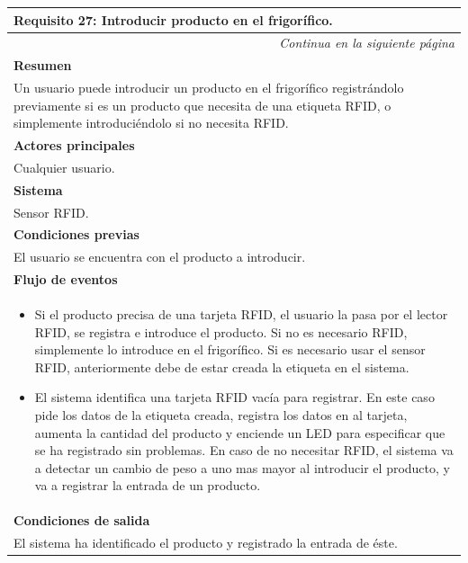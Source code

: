 \begin{longtable}{|p{}|}
\hline
 \rowcolor[gray]{.5}
 \color{white}\textbf{Requisito 27: Introducir producto en el frigorífico.} \\
\hline
\endfirsthead
\endhead
\hline \multicolumn{1}{r}{\textit{Continua en la siguiente página}} \\
\endfoot
\endlastfoot
     \rowcolor[gray]{.9}
     \textbf{Resumen} \\
     \hline
     Un usuario puede introducir un producto en el frigorífico registrándolo previamente si es un producto que necesita de una etiqueta RFID, o simplemente introduciéndolo si no necesita RFID.\\
     \hline
     \rowcolor[gray]{.9}
     \textbf{Actores principales} \\
     \hline
     Cualquier usuario. \\
     \hline
     \rowcolor[gray]{.9}
     \textbf{Sistema} \\
     \hline
     Sensor RFID. \\
     \hline
     \rowcolor[gray]{.9}
     \textbf{Condiciones previas} \\
     \hline
     El usuario se encuentra con el producto a introducir. \\
     \hline
     \rowcolor[gray]{.9}
     \textbf{Flujo de eventos}  \\
     \hline
      \begin{itemize}
         \item Si el producto precisa de una tarjeta RFID, el usuario la pasa por el lector RFID, se registra e introduce el producto. Si no es necesario RFID, simplemente lo introduce en el frigorífico. Si es necesario usar el sensor RFID, anteriormente debe de estar creada la etiqueta en el sistema.
         \item El sistema identifica una tarjeta RFID vacía para registrar. En este caso pide los datos de la etiqueta creada, registra los datos en al tarjeta, aumenta la cantidad del producto  y enciende un LED para especificar que se ha registrado sin problemas. En caso de no necesitar RFID, el sistema va a detectar un cambio de peso a uno mas mayor al introducir el producto, y va a registrar la entrada de un producto.
     \end{itemize} \\
     \hline
     \rowcolor[gray]{.9}
     \textbf{Condiciones de salida} \\
     \hline
     El sistema ha identificado el producto y registrado la entrada de éste. \\

\end{longtable}
